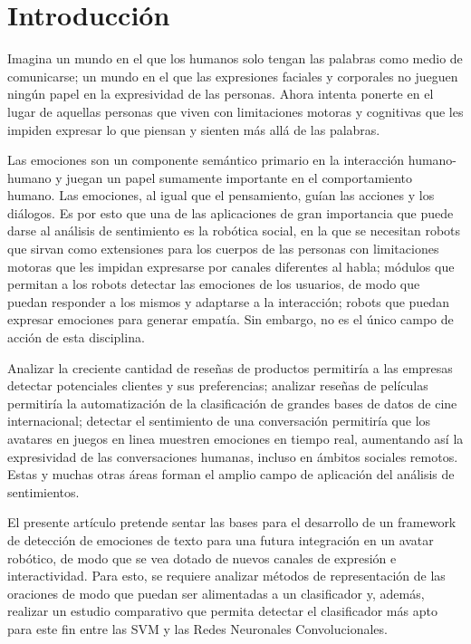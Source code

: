 \documentclass[conference]{IEEEtran}
\begin{document}
\section{Introducción}

    Imagina un mundo en el que los humanos solo tengan las palabras como medio de comunicarse; un mundo en el que las expresiones faciales y corporales no jueguen ningún papel en la expresividad de las personas. Ahora intenta ponerte en el lugar de aquellas personas que viven con limitaciones motoras y cognitivas que les impiden expresar lo que piensan y sienten más allá de las palabras.

    Las emociones son un componente semántico primario en la interacción humano-humano y juegan un papel sumamente importante en el comportamiento humano. Las emociones, al igual que el pensamiento, guían las acciones y los diálogos. Es por esto que una de las aplicaciones de gran importancia que puede darse al análisis de sentimiento es la robótica social, en la que se necesitan robots que sirvan como extensiones para los cuerpos de las personas con limitaciones motoras que les impidan expresarse por canales diferentes al habla; módulos que permitan a los robots detectar las emociones de los usuarios, de modo que puedan responder a los mismos y adaptarse a la interacción; robots que puedan expresar emociones para generar empatía. Sin embargo, no es el único campo de acción de esta disciplina.
    
    Analizar la creciente cantidad de reseñas de productos permitiría a las empresas detectar potenciales clientes y sus preferencias; analizar reseñas de películas permitiría la automatización de la clasificación de grandes bases de datos de cine internacional; detectar el sentimiento de una conversación permitiría que los avatares en juegos en linea muestren emociones en tiempo real, aumentando así la expresividad de las conversaciones humanas, incluso en ámbitos sociales remotos. Estas y muchas otras áreas forman el amplio campo de aplicación del análisis de sentimientos.
    
    El presente artículo pretende sentar las bases para el desarrollo de un framework de detección de emociones de texto para una futura integración en un avatar robótico, de modo que se vea dotado de nuevos canales de expresión e interactividad. Para esto, se requiere analizar métodos de representación de las oraciones de modo que puedan ser alimentadas a un clasificador y, además, realizar un estudio comparativo que permita detectar el clasificador más apto para este fin entre las SVM y las Redes Neuronales Convolucionales.
    
\end{document}
